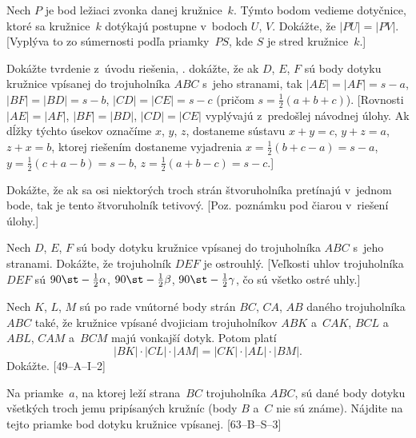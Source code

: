 {
Nech $P$ je bod ležiaci zvonka danej kružnice~$k$. Týmto bodom vedieme dotyčnice, ktoré sa kružnice~$k$ dotýkajú postupne v~bodoch $U$, $V$. Dokážte, že $|PU|=|PV|$. [Vyplýva to zo súmernosti podľa priamky~$PS$, kde $S$ je stred kružnice~$k$.]

Dokážte tvrdenie z~úvodu riešenia, \tj. dokážte, že ak $D$, $E$, $F$ sú body dotyku kružnice vpísanej do trojuholníka $ABC$ s~jeho stranami, tak
$|AE|=|AF|=s-a$, $|BF|=|BD|=s-b$, $|CD|=|CE|=s-c$ (pričom $s=\frac12(a+b+c)$). [Rovnosti $|AE|=|AF|$, $|BF|=|BD|$, $|CD|=|CE|$ vyplývajú z~predošlej návodnej úlohy. Ak dĺžky týchto úsekov označíme $x$, $y$, $z$, dostaneme sústavu $x+y=c$, $y+z=a$, $z+x=b$, ktorej riešením dostaneme vyjadrenia $x=\frac12(b+c-a)=s-a$, $y=\frac12(c+a-b)=s-b$, $z=\frac12(a+b-c)=s-c$.]

Dokážte, že ak sa osi niektorých troch strán štvoruholníka pretínajú v~jednom bode, tak je tento štvoruholník tetivový.
[Poz. poznámku pod čiarou v~riešení úlohy.]

Nech $D$, $E$, $F$ sú body dotyku kružnice vpísanej do trojuholníka $ABC$ s~jeho stranami. Dokážte, že trojuholník $DEF$ je ostrouhlý.
[Veľkosti uhlov trojuholníka $DEF$ sú $90\st-\frac12\alpha$, $90\st-\frac12\beta$, $90\st-\frac12\gamma$, čo sú všetko ostré uhly.]

\D
Nech $K$, $L$, $M$ sú po rade vnútorné body strán $BC$, $C\!A$,
$AB$ daného trojuholníka $ABC$ také, že kružnice vpísané
dvojiciam trojuholníkov  $ABK$ a~$C\!AK$, $BC\!L$ a~$ABL$, $C\!AM$
a~$BC\!M$ majú vonkajší dotyk. Potom platí
$$
|BK|\cdot|CL|\cdot|AM|=|CK|\cdot|AL|\cdot|BM|.
$$
Dokážte.
[49--A--I--2]

Na priamke~$a$, na ktorej leží strana~$BC$ trojuholníka $ABC$, sú dané body dotyku
všetkých troch jemu pripísaných kružníc (body $B$ a~$C$ nie sú známe).
Nájdite na tejto priamke bod dotyku kružnice vpísanej.
[63--B--S--3]

}

